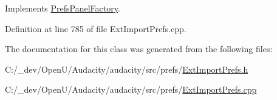 Implements \hyperlink{class_prefs_panel_factory_a4814184d6050665a43f4929caa73aa0c}{Prefs\+Panel\+Factory}.



Definition at line 785 of file Ext\+Import\+Prefs.\+cpp.



The documentation for this class was generated from the following files\+:\begin{DoxyCompactItemize}
\item 
C\+:/\+\_\+dev/\+Open\+U/\+Audacity/audacity/src/prefs/\hyperlink{_ext_import_prefs_8h}{Ext\+Import\+Prefs.\+h}\item 
C\+:/\+\_\+dev/\+Open\+U/\+Audacity/audacity/src/prefs/\hyperlink{_ext_import_prefs_8cpp}{Ext\+Import\+Prefs.\+cpp}\end{DoxyCompactItemize}
